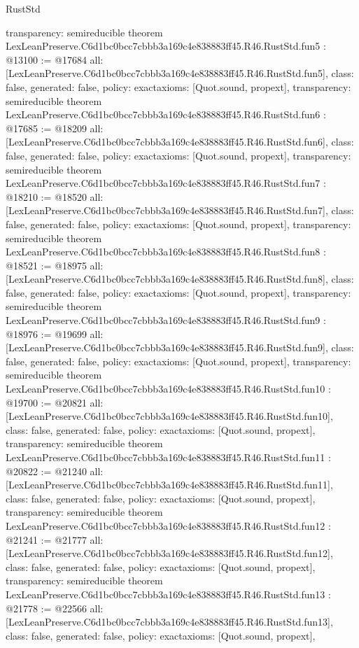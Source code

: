 \begin{lexlean}{RustStd}
\begin{coremodule}
{  transparency: semireducible
}
theorem LexLeanPreserve.C6d1bc0bcc7cbbb3a169c4e838883ff45.R46.RustStd.fun5 : @13100 := @17684 {
  all: [LexLeanPreserve.C6d1bc0bcc7cbbb3a169c4e838883ff45.R46.RustStd.fun5],
  class: false,
  generated: false,
  policy: exact{axioms: [Quot.sound, propext]},
  transparency: semireducible
}
theorem LexLeanPreserve.C6d1bc0bcc7cbbb3a169c4e838883ff45.R46.RustStd.fun6 : @17685 := @18209 {
  all: [LexLeanPreserve.C6d1bc0bcc7cbbb3a169c4e838883ff45.R46.RustStd.fun6],
  class: false,
  generated: false,
  policy: exact{axioms: [Quot.sound, propext]},
  transparency: semireducible
}
theorem LexLeanPreserve.C6d1bc0bcc7cbbb3a169c4e838883ff45.R46.RustStd.fun7 : @18210 := @18520 {
  all: [LexLeanPreserve.C6d1bc0bcc7cbbb3a169c4e838883ff45.R46.RustStd.fun7],
  class: false,
  generated: false,
  policy: exact{axioms: [Quot.sound, propext]},
  transparency: semireducible
}
theorem LexLeanPreserve.C6d1bc0bcc7cbbb3a169c4e838883ff45.R46.RustStd.fun8 : @18521 := @18975 {
  all: [LexLeanPreserve.C6d1bc0bcc7cbbb3a169c4e838883ff45.R46.RustStd.fun8],
  class: false,
  generated: false,
  policy: exact{axioms: [Quot.sound, propext]},
  transparency: semireducible
}
theorem LexLeanPreserve.C6d1bc0bcc7cbbb3a169c4e838883ff45.R46.RustStd.fun9 : @18976 := @19699 {
  all: [LexLeanPreserve.C6d1bc0bcc7cbbb3a169c4e838883ff45.R46.RustStd.fun9],
  class: false,
  generated: false,
  policy: exact{axioms: [Quot.sound, propext]},
  transparency: semireducible
}
theorem LexLeanPreserve.C6d1bc0bcc7cbbb3a169c4e838883ff45.R46.RustStd.fun10 : @19700 := @20821 {
  all: [LexLeanPreserve.C6d1bc0bcc7cbbb3a169c4e838883ff45.R46.RustStd.fun10],
  class: false,
  generated: false,
  policy: exact{axioms: [Quot.sound, propext]},
  transparency: semireducible
}
theorem LexLeanPreserve.C6d1bc0bcc7cbbb3a169c4e838883ff45.R46.RustStd.fun11 : @20822 := @21240 {
  all: [LexLeanPreserve.C6d1bc0bcc7cbbb3a169c4e838883ff45.R46.RustStd.fun11],
  class: false,
  generated: false,
  policy: exact{axioms: [Quot.sound, propext]},
  transparency: semireducible
}
theorem LexLeanPreserve.C6d1bc0bcc7cbbb3a169c4e838883ff45.R46.RustStd.fun12 : @21241 := @21777 {
  all: [LexLeanPreserve.C6d1bc0bcc7cbbb3a169c4e838883ff45.R46.RustStd.fun12],
  class: false,
  generated: false,
  policy: exact{axioms: [Quot.sound, propext]},
  transparency: semireducible
}
theorem LexLeanPreserve.C6d1bc0bcc7cbbb3a169c4e838883ff45.R46.RustStd.fun13 : @21778 := @22566 {
  all: [LexLeanPreserve.C6d1bc0bcc7cbbb3a169c4e838883ff45.R46.RustStd.fun13],
  class: false,
  generated: false,
  policy: exact{axioms: [Quot.sound, propext]},
}
\end{coremodule}
\end{lexlean}
